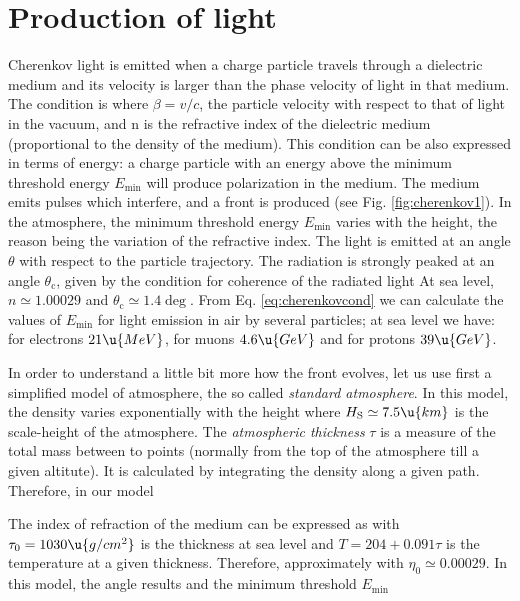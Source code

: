 \samplelonglatdistfig

\section{Production of \Cherenkov light}

Cherenkov light is emitted when a charge particle travels through a
dielectric medium and its velocity is larger than the phase velocity
of light in that medium. The condition is
%
\Cherenkovcondeq
%
where $\beta=v/c$, the particle velocity with respect to that of light
in the vacuum, and n is the refractive index of the dielectric medium
(proportional to the density of the medium). This condition can be
also expressed in terms of energy: a charge particle with an energy
above the minimum threshold energy $E_{\mathrm{min}}$ will produce
polarization in the medium. The medium emits pulses which interfere,
and a front is produced (see Fig. \ref{fig:cherenkov1}). In the
atmosphere, the minimum threshold energy $E_{\mathrm{min}}$ varies
with the height, the reason being the variation of the refractive
index. The light is emitted at an angle $\theta$ with respect to the
particle trajectory. The radiation is strongly peaked at an angle
$\theta_{\mathrm{c}}$, given by the condition for coherence of the
radiated light
%
\lightcoherenceeq
%
At sea level, $n \simeq 1.00029$ and $\theta_{\mathrm{c}} \simeq
1.4\deg$. From Eq. \eqref{eq:cherenkovcond} we can calculate the
values of $E_{\mathrm{min}}$ for \Cherenkov light emission in air by
several particles; at sea level we have: for electrons $21\u{MeV}$,
for muons $4.6\u{GeV}$ and for protons $39\u{GeV}$.

In order to understand a little bit more how the \Cherenkov front
evolves, let us use first a simplified model of atmosphere, the so
called \emph{standard atmosphere}. In this model, the density varies
exponentially with the height
%
\exprhoeq
%
where $H_{\mathrm{S}} \simeq 7.5\u{km}$ is the scale-height of the
atmosphere. The \emph{atmospheric thickness} $\tau$ is a measure of
the total mass between to points (normally from the top of the
atmosphere till a given altitute). It is calculated by integrating the
density along a given path. Therefore, in our model
%
\pathinteq

\cherenkovfig
%
The index of refraction of the medium can be expressed as 
%
%
with $\tau_0=1030\u{g/cm^2}$ is the thickness at sea level and $T=204
+ 0.091\tau$ is the temperature at a given thickness. Therefore,
approximately
%
\etaeq
%
with $\eta_0 \simeq 0.00029$. In this model, the \Cherenkov angle
results 
%
\Cherenkovangleeq
%
and the minimum threshold $E_{\mathrm{min}}$
%
\Emineq

